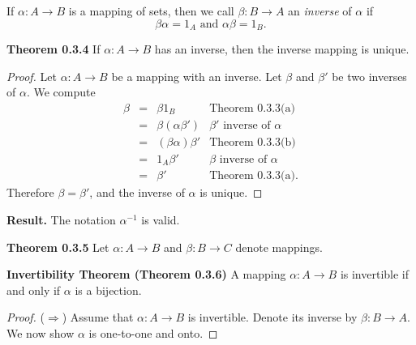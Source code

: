 \documentclass[12pt]{article}
\begin{document}
{\begin{defn}
	If $\alpha:A\to B$ is a mapping of sets, then we call $\beta:B\to A$ an \emph{inverse} of $\alpha$ if
		\[\beta\alpha = 1_A\text{ and }\alpha\beta=1_B.\]
\end{defn}

{
		\textbf{Theorem 0.3.4}
				If $\alpha:A\to B$ has an inverse, then the inverse mapping is unique.
		\begin{proof}
				Let $\alpha:A\to B$ be a mapping with an inverse.  Let $\beta$ and $\beta'$ be two inverses of $\alpha$.
				We compute
					$$\begin{array}{rcll}
							\beta &=& \beta 1_B&\text{Theorem 0.3.3(a)}\\
								 &=&\beta(\alpha\beta')&\beta'\text{ inverse of }\alpha\\
								 &=&(\beta\alpha)\beta'&\text{Theorem 0.3.3(b)}\\
								 &=&1_A\beta'&\beta\text{ inverse of }\alpha\\
								 &=&\beta'&\text{Theorem 0.3.3(a)}.
						\end{array}$$
				Therefore $\beta=\beta'$, and the inverse of $\alpha$ is unique.
			\end{proof}
		{\textbf{Result.}}
				The notation $\alpha^{-1}$ is valid.

	}
{
		\textbf{Theorem 0.3.5}
				Let $\alpha:A\to B$ and $\beta: B \to C$ denote mappings.

	}
\newpage
\textbf{Invertibility Theorem (Theorem 0.3.6)}
		A mapping $\alpha:A\to B$ is invertible if and only if $\alpha$ is a bijection.
	\begin{proof}
		($\Rightarrow$) Assume that $\alpha:A\to B$ is invertible.  Denote its inverse by $\beta:B\to A$.  We now show $\alpha$ is one-to-one and onto.
		

\end{proof}}
\end{document}

